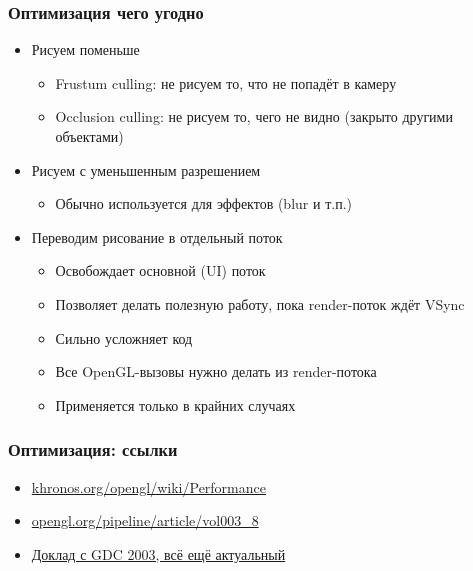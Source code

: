 \documentclass{beamer}
\begin{document}
\begin{frame}[fragile]
\frametitle{Оптимизация чего угодно}
\begin{itemize}
\item Рисуем поменьше
\begin{itemize}
\item Frustum culling: не рисуем то, что не попадёт в камеру
\pause
\item Occlusion culling: не рисуем то, чего не видно (закрыто другими объектами)
\end{itemize}
\pause
\item Рисуем с уменьшенным разрешением
\begin{itemize}
\item Обычно используется для эффектов (blur и т.п.)
\end{itemize}
\pause
\item Переводим рисование в отдельный поток
\begin{itemize}
\item Освобождает основной (UI) поток
\pause
\item Позволяет делать полезную работу, пока render-поток ждёт VSync
\pause
\item Сильно усложняет код
\pause
\item Все OpenGL-вызовы нужно делать из render-потока
\pause
\item Применяется только в крайних случаях
\end{itemize}
\end{itemize}
\end{frame}

\begin{frame}[fragile]
\frametitle{Оптимизация: ссылки}
\begin{itemize}
\item \href{https://www.khronos.org/opengl/wiki/Performance}{khronos.org/opengl/wiki/Performance}
\item \href{https://www.opengl.org/pipeline/article/vol003_8}{opengl.org/pipeline/article/vol003\_8}
\item \href{https://www.nvidia.com/docs/IO/8230/GDC2003_OGL_Performance.pdf}{Доклад с GDC 2003, всё ещё актуальный}
\end{itemize}
\end{frame}
\end{document}
